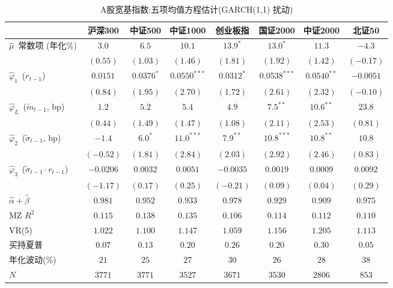 \begin{table}[htbp]\centering
\caption{A股宽基指数:五项均值方程估计(GARCH(1,1) 扰动)}\label{tab:ashare}
\footnotesize\setlength{\tabcolsep}{4pt}
\begin{threeparttable}
\begin{tabular}{lccccccc}
\toprule
 & 沪深300 & 中证500 & 中证1000 & 创业板指 & 国证2000 & 中证2000 & 北证50 \\
\midrule
$\hat\mu$~常数项 (年化\%) & $3.0$ & $6.5$ & $10.1$ & $13.9^{*}$ & $13.0^{*}$ & $11.3$ & $-4.3$ \\
 & $(0.55)$ & $(1.03)$ & $(1.46)$ & $(1.81)$ & $(1.92)$ & $(1.42)$ & $(-0.17)$ \\[2pt]
$\hat\varphi_1$~($r_{t-1}$) & $0.0151$ & $0.0376^{*}$ & $0.0550^{***}$ & $0.0312^{*}$ & $0.0538^{***}$ & $0.0540^{**}$ & $-0.0051$ \\
 & $(0.84)$ & $(1.95)$ & $(2.70)$ & $(1.72)$ & $(2.61)$ & $(2.32)$ & $(-0.10)$ \\[2pt]
$\hat\varphi_L$~($\tilde m_{t-1}$, bp) & $1.2$ & $5.2$ & $5.4$ & $4.9$ & $7.5^{**}$ & $10.6^{**}$ & $23.8$ \\
 & $(0.44)$ & $(1.49)$ & $(1.47)$ & $(1.08)$ & $(2.11)$ & $(2.53)$ & $(0.81)$ \\[2pt]
$\hat\varphi_2$~($\tilde\sigma_{t-1}$, bp) & $-1.4$ & $6.0^{*}$ & $11.0^{***}$ & $7.9^{**}$ & $10.8^{***}$ & $10.8^{**}$ & $10.8$ \\
 & $(-0.52)$ & $(1.81)$ & $(2.84)$ & $(2.03)$ & $(2.92)$ & $(2.46)$ & $(0.83)$ \\[2pt]
$\hat\varphi_3$~($\tilde\sigma_{t-1}\!\cdot\! r_{t-1}$) & $-0.0206$ & $0.0032$ & $0.0051$ & $-0.0035$ & $0.0019$ & $0.0009$ & $0.0092$ \\
 & $(-1.17)$ & $(0.17)$ & $(0.25)$ & $(-0.21)$ & $(0.09)$ & $(0.04)$ & $(0.29)$ \\[2pt]
\midrule
$\hat\alpha+\hat\beta$ & $0.981$ & $0.952$ & $0.933$ & $0.978$ & $0.929$ & $0.909$ & $0.975$ \\
MZ $R^2$ & $0.115$ & $0.138$ & $0.135$ & $0.106$ & $0.114$ & $0.112$ & $0.110$ \\
VR(5) & $1.022$ & $1.100$ & $1.147$ & $1.059$ & $1.156$ & $1.205$ & $1.113$ \\
买持夏普 & $0.07$ & $0.13$ & $0.20$ & $0.26$ & $0.20$ & $0.30$ & $0.05$ \\
年化波动(\%) & $21$ & $25$ & $27$ & $30$ & $26$ & $28$ & $38$ \\
$N$ & $3771$ & $3771$ & $3527$ & $3671$ & $3530$ & $2806$ & $853$ \\

\end{tabular}
\end{threeparttable}
\end{table}
